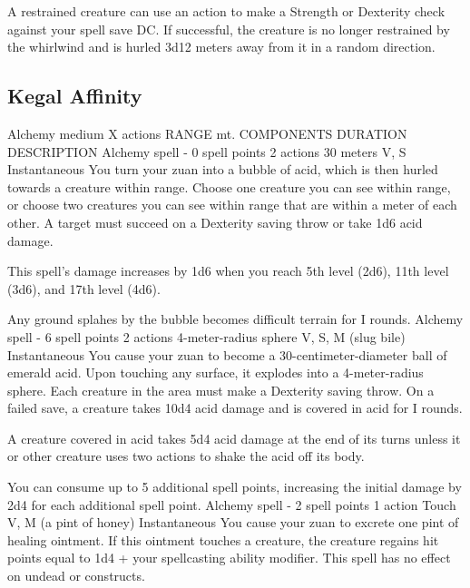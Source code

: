         A restrained creature can use an action to make a Strength or Dexterity check against your spell save DC.
        If successful, the creature is no longer restrained by the whirlwind and is hurled 3d12 meters away from it in a random direction.
\subsection*{Kegal Affinity}
        {Alchemy medium}
        {X actions}
        {RANGE mt.}
        {COMPONENTS}
        {DURATION}
        DESCRIPTION
        {Alchemy spell - 0 spell points}
        {2 actions}
        {30 meters}
        {V, S}
        {Instantaneous}
        You turn your zuan into a bubble of acid, which is then hurled towards a creature within range.
        Choose one creature you can see within range, or choose two creatures you can see within range that are within a meter of each other.
        A target must succeed on a Dexterity saving throw or take 1d6 acid damage.

        This spell's damage increases by 1d6 when you reach 5th level (2d6), 11th level (3d6), and 17th level (4d6).

        Any ground splahes by the bubble becomes difficult terrain for I rounds.
        {Alchemy spell - 6 spell points}
        {2 actions}
        {4-meter-radius sphere}
        {V, S, M (slug bile)}
        {Instantaneous}
        You cause your zuan to become a 30-centimeter-diameter ball of emerald acid.
        Upon touching any surface, it explodes into a 4-meter-radius sphere.
        Each creature in the area must make a Dexterity saving throw.
        On a failed save, a creature takes 10d4 acid damage and is covered in acid for I rounds.

        A creature covered in acid takes 5d4 acid damage at the end of its turns unless it or other creature uses two actions to shake the acid off its body.

        You can consume up to 5 additional spell points, increasing the initial damage by 2d4 for each additional spell point.
        {Alchemy spell - 2 spell points}
        {1 action}
        {Touch}
        {V, M (a pint of honey)}
        {Instantaneous}
        You cause your zuan to excrete one pint of healing ointment.
        If this ointment touches a creature, the creature regains hit points equal to 1d4 + your spellcasting ability modifier.
        This spell has no effect on undead or constructs.

